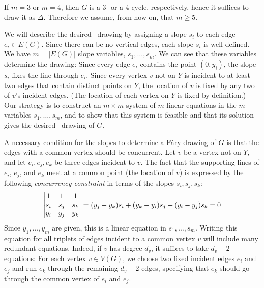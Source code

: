 If $m=3$ or $m=4$, then $G$ is a 3- or a 4-cycle, respectively, hence it suffices to draw it as $\Delta$. Therefore we assume, from now on, that $m\ge 5$.  


We will describe the desired \Fary\ drawing by assigning a slope $s_i$
to each edge $e_i\in E(G)$.   Since there can be no vertical edges,
each slope $s_i$ is well-defined. We have $m=|E(G)|$ slope variables,
$s_1,\ldots,s_m$. 
We can see that these variables determine the drawing:
 Since every edge $e_i$ contains the point $(0,y_i)$,
the slope $s_i$ fixes the line through $e_i$.  Since every vertex $v$
not on $Y$ is incident to at least two edges that contain distinct points
on $Y$, the location of $v$ is fixed by any two of $v$'s incident edges.  
(The location of each vertex on
$Y$ is fixed by definition.)  Our strategy is to construct an $m\times m$
system of $m$ linear equations in the $m$ variables $s_1,\ldots,s_m$,
and to show that
this system is feasible and that its solution gives the desired \Fary\
drawing of $G$.

A necessary condition for the slopes to determine a F\'ary drawing of
$G$ is that the %
edges 
with a common vertex should be concurrent. Let $v$ be a vertex 
not on $Y$, and let $e_i, e_j, e_k$ be three edges incident to $v$.
The fact that the supporting lines of $e_i$, $e_j$, and $e_k$
meet at a common point (the location of $v$) is expressed by the following
\emph{concurrency constraint} in terms of the slopes $s_i,s_j,s_k$:
\begin{equation}\eqlabel{slope0} 
\left|
\begin{matrix}
1&1&1\\
s_i&s_j&s_k\\
y_i&y_j&y_k
\end{matrix}
\right|=
({y_j-y_k}) s_i + ({y_k-y_i}) s_j 
+ ({y_i-y_j})s_k  = 0
\end{equation}
Since $y_1,\ldots,y_m$ are given, this is a linear equation
in $s_1,\ldots,s_m$.
Writing this equation for all triplets of edges incident to a common
vertex $v$ will include many redundant equations. Indeed,
if $v$ has degree $d_v$,
it suffices to take $d_v-2$ equations: For each vertex $v\in V(G)$, we choose two fixed
incident edges $e_i$ and $e_j$ and run $e_k$ through the remaining
$d_v-2$ edges, specifying that $e_k$ should go through the common vertex
of $e_i$ and $e_j$.

